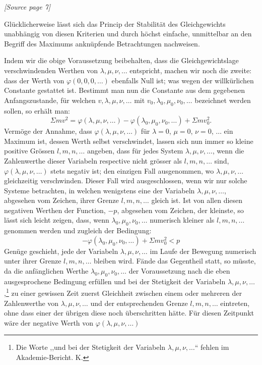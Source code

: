 \documentclass[11pt]{article}
\newcommand{\sourcepage}[1]{\par\smallskip\noindent\textit{[Source page #1]}\par\smallskip}
\begin{document}
\sourcepage{7}

Glücklicherweise lässt sich das Princip der Stabilität des Gleichgewichts unabhängig von diesen Kriterien und durch höchst einfache, unmittelbar an den Begriff des Maximums anknüpfende Betrachtungen nachweisen.

Indem wir die obige Voraussetzung beibehalten, dass die Gleichgewichtslage verschwindenden Werthen von $\lambda,\mu,\nu,\ldots$ entspricht, machen wir noch die zweite: dass der Werth von $\varphi(0,0,0,\ldots)$ ebenfalls Null ist; was wegen der willkürlichen Constante gestattet ist. Bestimmt man nun die Constante aus dem gegebenen Anfangszustande, für welchen $v,\lambda,\mu,\nu,\ldots$ mit $v_0,\lambda_0,\mu_0,\nu_0,\ldots$ bezeichnet werden sollen, so erhält man:
\[
\Sigma m v^2 = \varphi(\lambda,\mu,\nu,\ldots)-\varphi(\lambda_0,\mu_0,\nu_0,\ldots)+\Sigma m v_0^2.
\]
Vermöge der Annahme, dass $\varphi(\lambda,\mu,\nu,\ldots)$ für $\lambda=0$, $\mu=0$, $\nu=0$, $\ldots$ ein Maximum ist, dessen Werth selbst verschwindet, lassen sich nun immer so kleine positive Grössen $l,m,n,\ldots$ angeben, dass für jedes System $\lambda,\mu,\nu,\ldots$, wenn die Zahlenwerthe dieser Variabeln respective nicht grösser als $l,m,n,\ldots$ sind, $\varphi(\lambda,\mu,\nu,\ldots)$ stets negativ ist; den einzigen Fall ausgenommen, wo $\lambda,\mu,\nu,\ldots$ gleichzeitig verschwinden. Dieser Fall wird ausgeschlossen, wenn wir nur solche Systeme betrachten, in welchen wenigstens eine der Variabeln $\lambda,\mu,\nu,\ldots$, abgesehen vom Zeichen, ihrer Grenze $l,m,n,\ldots$ gleich ist. Ist von allen diesen negativen Werthen der Function, $-p$, abgesehen vom Zeichen, der kleinste, so lässt sich leicht zeigen, dass, wenn $\lambda_0,\mu_0,\nu_0,\ldots$ numerisch kleiner als $l,m,n,\ldots$ genommen werden und zugleich der Bedingung:
\[
-\varphi(\lambda_0,\mu_0,\nu_0,\ldots)+\Sigma m v_0^2<p
\]
Genüge geschieht, jede der Variabeln $\lambda,\mu,\nu,\ldots$ im Laufe der Bewegung numerisch unter ihrer Grenze $l,m,n,\ldots$ bleiben wird. Fände das Gegentheil statt, so müsste, da die anfänglichen Werthe $\lambda_0,\mu_0,\nu_0,\ldots$ der Voraussetzung nach die eben ausgesprochene Bedingung erfüllen und bei der Stetigkeit der Variabeln $\lambda,\mu,\nu,\ldots$,\footnote{Die Worte ,,und bei der Stetigkeit der Variabeln $\lambda,\mu,\nu,\ldots$`` fehlen im Akademie-Bericht. K.} zu einer gewissen Zeit zuerst Gleichheit zwischen einem oder mehreren der Zahlenwerthe von $\lambda,\mu,\nu,\ldots$ und der entsprechenden Grenze $l,m,n,\ldots$ eintreten, ohne dass einer der übrigen diese noch überschritten hätte. Für diesen Zeitpunkt wäre der negative Werth von $\varphi(\lambda,\mu,\nu,\ldots)$
\end{document}
